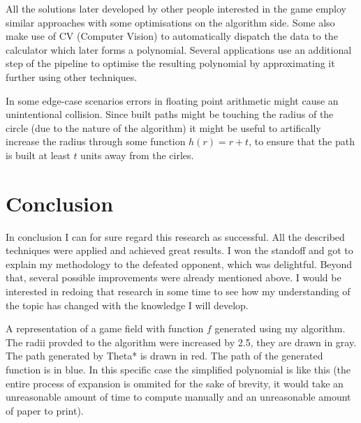 \documentclass[12pt, titlepage]{article}
\begin{document}
All the solutions later developed by other people interested in the game employ
similar approaches with some optimisations on the algorithm side. Some also
make use of CV (Computer Vision) to automatically dispatch the data to the
calculator which later forms a polynomial. Several applications use
an additional step of the pipeline to optimise the resulting polynomial
by approximating it further using other techniques.

In some edge-case scenarios errors in floating point arithmetic might 
cause an unintentional collision. Since built paths might be touching 
the radius of the circle (due to the nature of the algorithm) it might be
useful to artifically increase the radius through some function $h(r) = r + t$,
to ensure that the path is built at least $t$ units away from the cirles.

\section{Conclusion}
In conclusion I can for sure regard this research as successful. All the
described techniques were applied and achieved great results. I won the
standoff and got to explain my methodology to the defeated opponent, which
was delightful. Beyond that, several possible improvements were already 
mentioned above. I would be interested in redoing that research in some time
to see how my understanding of the topic has changed with the knowledge I will
develop.

\begin{center}
\end{center}
A representation of a game field with function $f$ generated using my
algorithm. The radii provded to the algorithm were increased by 2.5,
they are drawn in gray. The path generated by Theta* is drawn in red.
The path of the generated function is in blue. In this specific case
the simplified polynomial is like this (the entire process of expansion
is ommited for the sake of brevity, it  would take an unreasonable amount 
of time to compute manually and an unreasonable amount of paper to print).
\end{document}
